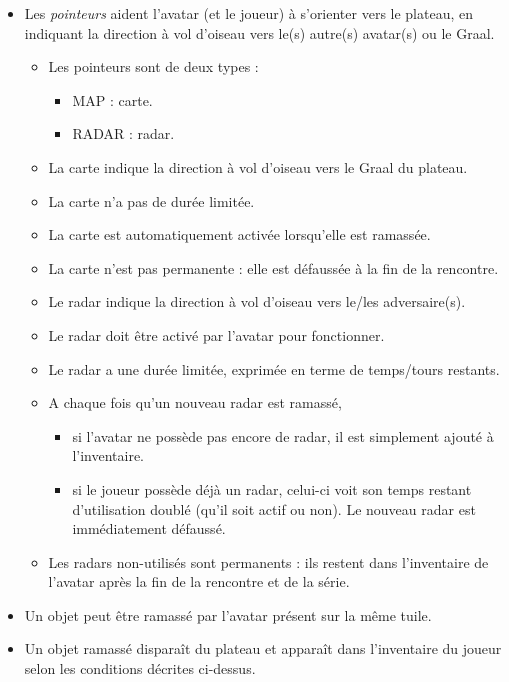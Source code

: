 \begin{itemize}
        \item Les \textit{pointeurs} aident l'avatar (et le joueur) à s'orienter vers le plateau, en indiquant la direction à vol d'oiseau vers le(s) autre(s) avatar(s) ou le Graal.
            \begin{itemize}
                \item Les pointeurs sont de deux types :
                    \begin{itemize}
                        \item MAP : carte.
                        \item RADAR : radar.
                    \end{itemize}
                \item La carte indique la direction à vol d'oiseau vers le Graal du plateau.
                \item La carte n'a pas de durée limitée.
                \item La carte est automatiquement activée lorsqu'elle est ramassée.
                \item La carte n'est pas permanente : elle est défaussée à la fin de la rencontre.
                \item Le radar indique la direction à vol d'oiseau vers le/les adversaire(s).
                \item Le radar doit être activé par l'avatar pour fonctionner.
                \item Le radar a une durée limitée, exprimée en terme de temps/tours restants.
                \item A chaque fois qu'un nouveau radar est ramassé, 
                    \begin{itemize}
                        \item si l'avatar ne possède pas encore de radar, il est simplement ajouté à l'inventaire.
                        \item si le joueur possède déjà un radar, celui-ci voit son temps restant d'utilisation doublé (qu'il soit actif ou non). Le nouveau radar est immédiatement défaussé.
                    \end{itemize}
                \item Les radars non-utilisés sont permanents : ils restent dans l'inventaire de l'avatar après la fin de la rencontre et de la série.
            \end{itemize}
        
        \item Un objet peut être ramassé par l'avatar présent sur la même tuile.
        \item Un objet ramassé disparaît du plateau et apparaît dans l'inventaire du joueur selon les conditions décrites ci-dessus.
    \end{itemize}

